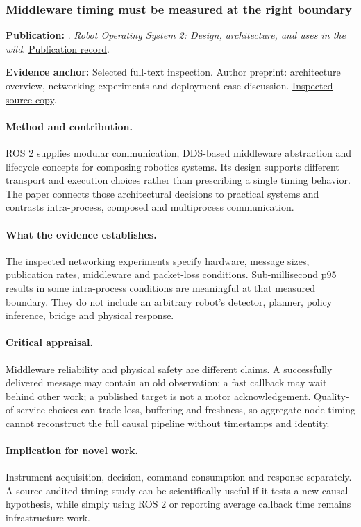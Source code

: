 \subsubsection{Middleware timing must be measured at the right boundary}\label{paper:ros2}
\textbf{Publication:} \citet{ros2}. \emph{Robot Operating System 2: Design, architecture, and uses in the wild}. \href{https://doi.org/10.1126/scirobotics.abm6074}{Publication record}.

\textbf{Evidence anchor:} Selected full-text inspection. Author preprint: architecture overview, networking experiments and deployment-case discussion. \href{https://arxiv.org/pdf/2211.07752}{Inspected source copy}.

\paragraph{Method and contribution.} ROS 2 supplies modular communication, DDS-based middleware abstraction and lifecycle concepts for composing robotics systems. Its design supports different transport and execution choices rather than prescribing a single timing behavior. The paper connects those architectural decisions to practical systems and contrasts intra-process, composed and multiprocess communication.

\paragraph{What the evidence establishes.} The inspected networking experiments specify hardware, message sizes, publication rates, middleware and packet-loss conditions. Sub-millisecond p95 results in some intra-process conditions are meaningful at that measured boundary. They do not include an arbitrary robot's detector, planner, policy inference, bridge and physical response.

\paragraph{Critical appraisal.} Middleware reliability and physical safety are different claims. A successfully delivered message may contain an old observation; a fast callback may wait behind other work; a published target is not a motor acknowledgement. Quality-of-service choices can trade loss, buffering and freshness, so aggregate node timing cannot reconstruct the full causal pipeline without timestamps and identity.

\paragraph{Implication for novel work.} Instrument acquisition, decision, command consumption and response separately. A source-audited timing study can be scientifically useful if it tests a new causal hypothesis, while simply using ROS 2 or reporting average callback time remains infrastructure work.

